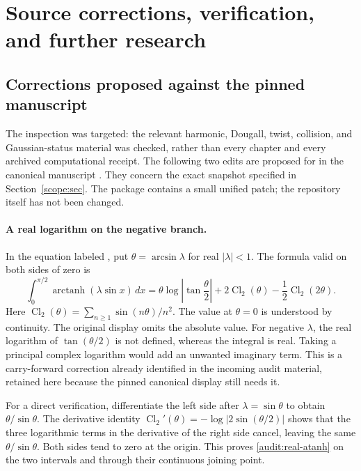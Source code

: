 \section{Source corrections, verification, and further research}
\label{audit:sec}

\subsection{Corrections proposed against the pinned manuscript}

The inspection was targeted: the relevant harmonic, Dougall, twist,
collision, and Gaussian-status material was checked, rather than every
chapter and every archived computational receipt. The following two
edits are proposed for  in the
canonical manuscript \cite{RepoMain}. They concern the exact snapshot
specified in Section~\ref{scope:sec}. The package contains a small
unified patch; the repository itself has not been changed.

\paragraph{A real logarithm on the negative branch.}
In the equation labeled , put
$\theta=\arcsin\lambda$ for real $|\lambda|<1$. The formula valid
on both sides of zero is
\begin{equation}\label{audit:real-atanh}
 \int_0^{\pi/2}\operatorname{arctanh}(\lambda\sin x)\,dx
 =\theta\log\left|\tan\frac\theta2\right|
       +2\operatorname{Cl}_2(\theta)
       -\frac12\operatorname{Cl}_2(2\theta).
\end{equation}
Here $\operatorname{Cl}_2(\theta)=\sum_{n\ge1}\sin(n\theta)/n^2$.
The value at $\theta=0$ is understood by continuity. The original
display omits the absolute value. For negative $\lambda$, the
real logarithm of $\tan(\theta/2)$ is not defined, whereas the
integral is real. Taking a principal complex logarithm would add
an unwanted imaginary term. This is a carry-forward correction
already identified in the incoming audit material, retained here
because the pinned canonical display still needs it.

For a direct verification, differentiate the left side after
$\lambda=\sin\theta$ to obtain $\theta/\sin\theta$.
The derivative identity
$\operatorname{Cl}_2'(\theta)=-\log|2\sin(\theta/2)|$
shows that the three logarithmic terms in the derivative of the
right side cancel, leaving the same $\theta/\sin\theta$.
Both sides tend to zero at the origin. This proves
\eqref{audit:real-atanh} on the two intervals and through their
continuous joining point.

